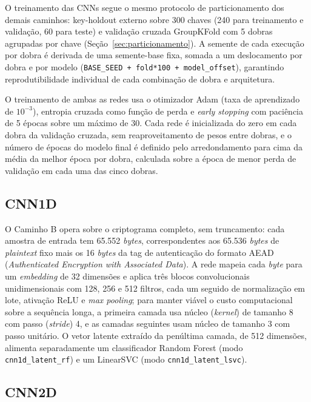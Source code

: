 O treinamento das CNNs segue o mesmo protocolo de particionamento dos demais caminhos: key-holdout externo sobre 300 chaves (240 para treinamento e validação, 60 para teste) e validação cruzada GroupKFold com 5 dobras agrupadas por chave (Seção~\ref{sec:particionamento}). A semente de cada execução por dobra é derivada de uma semente-base fixa, somada a um deslocamento por dobra e por modelo (\texttt{BASE\_SEED + fold*100 + model\_offset}), garantindo reprodutibilidade individual de cada combinação de dobra e arquitetura.

O treinamento de ambas as redes usa o otimizador Adam (taxa de aprendizado de $10^{-3}$), entropia cruzada como função de perda e \emph{early stopping} com paciência de 5 épocas sobre um máximo de 30. Cada rede é inicializada do zero em cada dobra da validação cruzada, sem reaproveitamento de pesos entre dobras, e o número de épocas do modelo final é definido pelo arredondamento para cima da média da melhor época por dobra, calculada sobre a época de menor perda de validação em cada uma das cinco dobras.

\subsection{CNN1D}
\label{sec:cnn1d-caminho-b}

O Caminho B opera sobre o criptograma completo, sem truncamento: cada amostra de entrada tem 65.552 \emph{bytes}, correspondentes aos 65.536 \emph{bytes} de \emph{plaintext} fixo mais os 16 \emph{bytes} da tag de autenticação do formato AEAD (\emph{Authenticated Encryption with Associated Data}). A rede mapeia cada \emph{byte} para um \emph{embedding} de 32 dimensões e aplica três blocos convolucionais unidimensionais com 128, 256 e 512 filtros, cada um seguido de normalização em lote, ativação ReLU e \emph{max pooling}; para manter viável o custo computacional sobre a sequência longa, a primeira camada usa núcleo (\emph{kernel}) de tamanho 8 com passo (\emph{stride}) 4, e as camadas seguintes usam núcleo de tamanho 3 com passo unitário. O vetor latente extraído da penúltima camada, de 512 dimensões, alimenta separadamente um classificador Random Forest (modo \texttt{cnn1d\_latent\_rf}) e um LinearSVC (modo \texttt{cnn1d\_latent\_lsvc}).

\subsection{CNN2D}
\label{sec:cnn2d-caminho-c}

